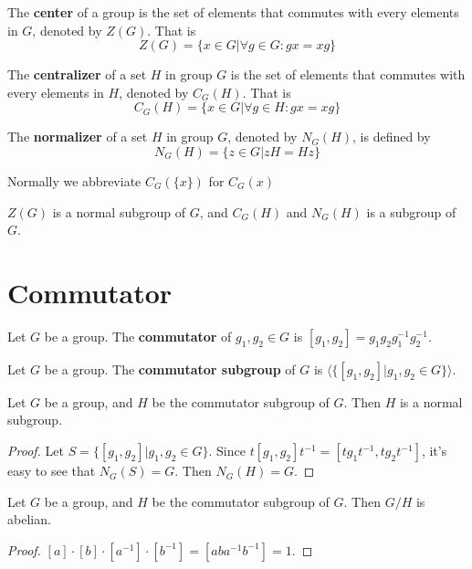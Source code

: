 \documentclass[12pt]{book}
\begin{document}
	\begin{definition}
	The \textbf{center} of a group is the set of elements that commutes with every elements in $G$, denoted by $Z(G)$. That is
	\begin{equation}
		Z(G)=\{x\in G|\forall g\in G:gx=xg\}
	\end{equation} 
	\end{definition}
	
	\begin{definition}
	The \textbf{centralizer} of a set $H$ in group $G$ is the set of elements that commutes with every elements in $H$, denoted by $C_G(H)$. That is
	\begin{equation}
		C_G(H)=\{x\in G|\forall g\in H:gx=xg\}
	\end{equation} 
	\end{definition}
	
	\begin{definition}
	The \textbf{normalizer} of a set $H$ in group $G$, denoted by $N_G(H)$, is defined by
	\begin{equation}
		N_G(H)=\{z\in G|zH=Hz\}
	\end{equation} 
	\end{definition}
	
	Normally  we abbreviate $C_G(\{x\})$ for $C_G(x)$
	\begin{lemma}
		$Z(G)$ is a normal subgroup of $G$, and $C_G(H)$ and $N_G(H)$ is a subgroup of $G$.
	\end{lemma}
	
	\section{Commutator}
	
	\begin{definition}
		Let $G$ be a group. The {\bf commutator} of $g_1,g_2\in G$ is $[g_1,g_2]=g_1g_2g_1^{-1}g_2^{-1}$.
	\end{definition}
	
	\begin{definition}
		Let $G$ be a group. The {\bf commutator subgroup} of $G$ is $\langle\{[g_1,g_2]|g_1,g_2\in G\}\rangle$.
	\end{definition}

	\begin{lemma}
		Let $G$ be a group, and $H$ be the commutator subgroup of $G$. Then $H$ is a normal subgroup.
	\end{lemma}
	\begin{proof}
		Let $S=\{[g_1,g_2]|g_1,g_2\in G\}$. Since $t[g_1,g_2]t^{-1}=[tg_1t^{-1},tg_2t^{-1}]$, it's easy to see that $N_G(S)=G$. Then $N_G(H)=G$.
	\end{proof}
	\begin{lemma}
		Let $G$ be a group, and $H$ be the commutator subgroup of $G$. Then $G/H$ is abelian.
	\end{lemma}
	\begin{proof}
		$[a]\cdot[b]\cdot[a^{-1}]\cdot[b^{-1}]=[aba^{-1}b^{-1}]=1$.
	\end{proof}
	
\end{document}
